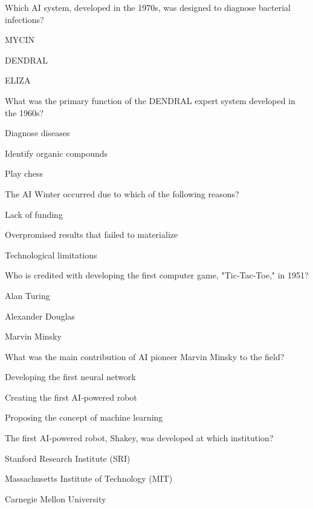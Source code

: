 \begin{enhancedmcq}{Which AI system, developed in the 1970s, was designed to diagnose bacterial infections?}
\item MYCIN
\item DENDRAL
\item ELIZA

\end{enhancedmcq}
\begin{enhancedmcq}{What was the primary function of the DENDRAL expert system developed in the 1960s?}
\item Diagnose diseases
\item Identify organic compounds
\item Play chess

\end{enhancedmcq}
\begin{enhancedmcq}{The AI Winter occurred due to which of the following reasons?}
\item Lack of funding
\item Overpromised results that failed to materialize
\item Technological limitations

\end{enhancedmcq}
\begin{enhancedmcq}{Who is credited with developing the first computer game, "Tic‑Tac‑Toe," in 1951?}
\item Alan Turing
\item Alexander Douglas
\item Marvin Minsky

\end{enhancedmcq}
\begin{enhancedmcq}{What was the main contribution of AI pioneer Marvin Minsky to the field?}
\item Developing the first neural network
\item Creating the first AI‑powered robot
\item Proposing the concept of machine learning

\end{enhancedmcq}
\begin{enhancedmcq}{The first AI‑powered robot, Shakey, was developed at which institution?}
\item Stanford Research Institute (SRI)
\item Massachusetts Institute of Technology (MIT)
\item Carnegie Mellon University

\end{enhancedmcq}
